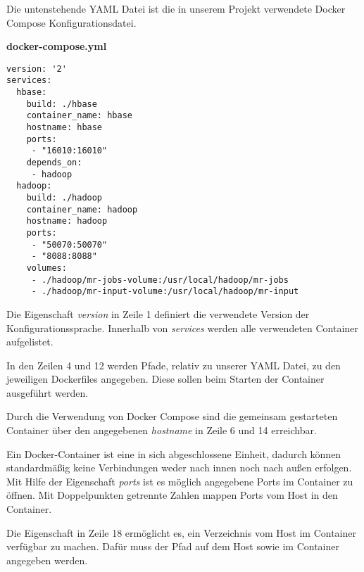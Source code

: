 Die untenstehende YAML Datei ist die in unserem Projekt verwendete Docker Compose Konfigurationsdatei.

\textbf{docker-compose.yml}

\lstset{language=XML}
\begin{lstlisting}
version: '2'
services:
  hbase:
    build: ./hbase
    container_name: hbase
    hostname: hbase
    ports:
     - "16010:16010"
    depends_on:
     - hadoop
  hadoop:
    build: ./hadoop
    container_name: hadoop
    hostname: hadoop
    ports:
     - "50070:50070"
     - "8088:8088"
    volumes:
     - ./hadoop/mr-jobs-volume:/usr/local/hadoop/mr-jobs
     - ./hadoop/mr-input-volume:/usr/local/hadoop/mr-input
\end{lstlisting}

Die Eigenschaft \textit{version} in Zeile 1 definiert die verwendete Version der Konfigurationssprache. Innerhalb von \textit{services} werden alle verwendeten Container aufgelistet.

In den Zeilen 4 und 12 werden Pfade, relativ zu unserer YAML Datei, zu den jeweiligen Dockerfiles angegeben. Diese sollen beim Starten der Container ausgeführt werden.

Durch die Verwendung von Docker Compose sind die gemeinsam gestarteten Container über den angegebenen \textit{hostname} in Zeile 6 und 14  erreichbar.

Ein Docker-Container ist eine in sich abgeschlossene Einheit, dadurch können standardmäßig keine Verbindungen weder nach innen noch nach außen erfolgen. Mit Hilfe der Eigenschaft \textit{ports} ist es möglich angegebene Ports im Container zu öffnen. Mit Doppelpunkten getrennte Zahlen mappen Ports vom Host in den Container.

Die Eigenschaft in Zeile 18 ermöglicht es, ein Verzeichnis vom Host im Container verfügbar zu machen. Dafür muss der Pfad auf dem Host sowie im Container angegeben werden.